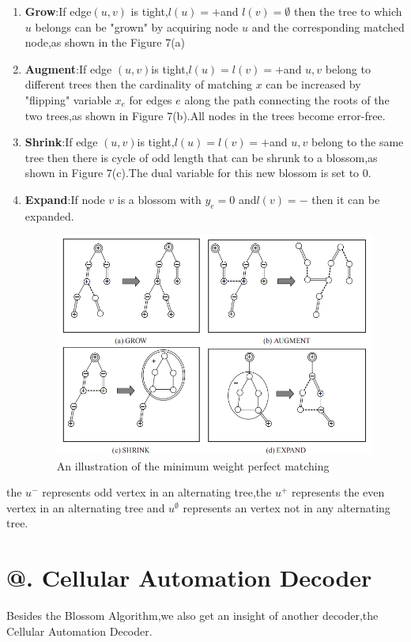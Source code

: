 \documentclass[
	a4paper, %
	10pt, %
	unnumberedsections, %
	twoside, %
]{LTJournalArticle}
\makeatletter
\newcommand{\Rmnum}[1]{\expandafter\@slowromancap\romannumeral #1@}
\makeatother
\begin{document}
\begin{enumerate}
	\item \textbf{Grow}:If edge$(u,v)$ is tight,$l(u) = + $and $l(v) = \emptyset$ then the tree to which $u$ belongs can be "grown" by acquiring node $u$ and the corresponding matched node,as shown in the Figure 7(a)
	\item \textbf{Augment}:If edge $(u,v) $is tight,$l(u) = l(v) = + $and $u,v$ belong to different trees then the cardinality of matching $x$ can be increased by "flipping" variable $x_e$ for edges $e$ along the path connecting the roots of the two trees,as shown in Figure 7(b).All nodes in the trees become error-free.
	\item \textbf{Shrink}:If edge $(u,v) $is tight,$l(u) = l(v) = + $and $u,v$ belong to the same tree then there is cycle of odd length that can be shrunk to a blossom,as shown in Figure 7(c).The dual variable for this new blossom is set to 0.
	\item \textbf{Expand}:If node $v$ is a blossom with $y_e = 0$ and$l(v) = -$ then it can be expanded.
\begin{figure} %
	\setlength{\abovecaptionskip}{0.cm} %
	\setlength{\abovecaptionskip}{0.cm} 
	\includegraphics[width=\linewidth]{img/minimum weight.png}
	\caption{An illustration of the minimum weight perfect matching}
\end{figure}
\end{enumerate}
	the $u^-$ represents odd vertex in an alternating tree,the $u^+$ represents the even vertex in an alternating tree and $u^{\emptyset}$ represents an vertex not in any alternating tree.
\section{\Rmnum{4}. Cellular Automation Decoder}
Besides the Blossom Algorithm,we also get an insight of another decoder,the Cellular Automation Decoder.
\end{document}
